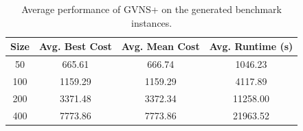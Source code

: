 \begin{table}[ht]
\centering
\caption{Average performance of GVNS+ on the generated benchmark instances.}
\label{tab:scalability}
\begin{tabular}{cccc}
\toprule
Size & Avg. Best Cost & Avg. Mean Cost & Avg. Runtime (s) \\
\midrule
50 & 665.61 & 666.74 & 1046.23 \\
100 & 1159.29 & 1159.29 & 4117.89 \\
200 & 3371.48 & 3372.34 & 11258.00 \\
400 & 7773.86 & 7773.86 & 21963.52 \\
\bottomrule
\end{tabular}
\end{table}